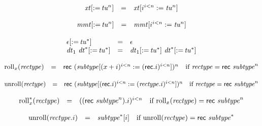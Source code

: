 $$
\begin{array}[t]{@{}lcl@{}l@{}}
{{\mathit{xt}}}{{}[ {:=}\, {{\mathit{tu}}^{n}} ]} & = & {{\mathit{xt}}}{{}[ {i^{i<n}} := {{\mathit{tu}}^{n}} ]} \\
\end{array}
$$

$$
\begin{array}[t]{@{}lcl@{}l@{}}
{{\mathit{mmt}}}{{}[ {:=}\, {{\mathit{tu}}^{n}} ]} & = & {{\mathit{mmt}}}{{}[ {i^{i<n}} := {{\mathit{tu}}^{n}} ]} \\
\end{array}
$$

$$
\begin{array}[t]{@{}lcl@{}l@{}}
{\epsilon}{{}[ {:=}\, {{\mathit{tu}}^\ast} ]} & = & \epsilon \\
{{\mathit{dt}}_1~{{\mathit{dt}}^\ast}}{{}[ {:=}\, {{\mathit{tu}}^\ast} ]} & = & {{\mathit{dt}}_1}{{}[ {:=}\, {{\mathit{tu}}^\ast} ]}~{{{\mathit{dt}}^\ast}}{{}[ {:=}\, {{\mathit{tu}}^\ast} ]} \\
\end{array}
$$

\vspace{1ex}

$$
\begin{array}[t]{@{}lcl@{}l@{}}
{{\mathrm{roll}}}_{x}({\mathit{rectype}}) & = & \mathsf{rec}~{({{\mathit{subtype}}}{{}[ {(x + i)^{i<n}} := {(\mathsf{rec} {.} i)^{i<n}} ]})^{n}} & \quad \mbox{if}~ {\mathit{rectype}} = \mathsf{rec}~{{\mathit{subtype}}^{n}} \\
\end{array}
$$

$$
\begin{array}[t]{@{}lcl@{}l@{}}
{\mathrm{unroll}}({\mathit{rectype}}) & = & \mathsf{rec}~{({{\mathit{subtype}}}{{}[ {(\mathsf{rec} {.} i)^{i<n}} := {({\mathit{rectype}} {.} i)^{i<n}} ]})^{n}} & \quad \mbox{if}~ {\mathit{rectype}} = \mathsf{rec}~{{\mathit{subtype}}^{n}} \\
\end{array}
$$

$$
\begin{array}[t]{@{}lcl@{}l@{}}
{{{{\mathrm{roll}}}_{x}^\ast}}{({\mathit{rectype}})} & = & {((\mathsf{rec}~{{\mathit{subtype}}^{n}}) {.} i)^{i<n}} & \quad \mbox{if}~ {{\mathrm{roll}}}_{x}({\mathit{rectype}}) = \mathsf{rec}~{{\mathit{subtype}}^{n}} \\
\end{array}
$$

$$
\begin{array}[t]{@{}lcl@{}l@{}}
{\mathrm{unroll}}({\mathit{rectype}} {.} i) & = & {{\mathit{subtype}}^\ast}{}[i] & \quad \mbox{if}~ {\mathrm{unroll}}({\mathit{rectype}}) = \mathsf{rec}~{{\mathit{subtype}}^\ast} \\
\end{array}
$$

